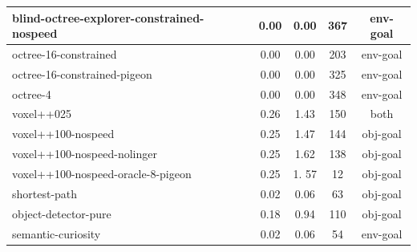 \begin{longtable}{|l|c|c|c|c|}
{\cellcolor[HTML]{D7C5AF}} \color[HTML]{000000}         blind-octree-explorer-constrained-nospeed        &         0.00         &      0.00  &   367 &      {\cellcolor[HTML]{D7C5AF}} \color[HTML]{000000}    env-goal \\ \hline
{\cellcolor[HTML]{D7C5AF}} \color[HTML]{000000}         octree-16-constrained        &         0.00         &      0.00  &   203 &              {\cellcolor[HTML]{D7C5AF}} \color[HTML]{000000}    env-goal \\ \hline
{\cellcolor[HTML]{D7C5AF}} \color[HTML]{000000}         octree-16-constrained-pigeon         &      0.00      &       0.00   &   325 &       {\cellcolor[HTML]{D7C5AF}} \color[HTML]{000000}   env-goal \\ \hline
{\cellcolor[HTML]{D7C5AF}} \color[HTML]{000000}         octree-4         &      0.00      &       0.00   &   348 &                           {\cellcolor[HTML]{D7C5AF}} \color[HTML]{000000}   env-goal \\ \hline
{\cellcolor[HTML]{B5C3D7}} \color[HTML]{000000}         voxel++025       &        0.26        &         1.43     &   150 &                         {\cellcolor[HTML]{B5C3D7}} \color[HTML]{000000} both \\ \hline
{\cellcolor[HTML]{C4D7B8}} \color[HTML]{000000}         voxel++100-nospeed       &        0.25        &         1.47     &   144 &                 {\cellcolor[HTML]{C4D7B8}} \color[HTML]{000000} obj-goal \\ \hline
{\cellcolor[HTML]{C4D7B8}} \color[HTML]{000000}         voxel++100-nospeed-nolinger      &       0.25       &        1.62    &   138 &        {\cellcolor[HTML]{C4D7B8}} \color[HTML]{000000} obj-goal \\ \hline
{\cellcolor[HTML]{C4D7B8}} \color[HTML]{000000}         voxel++100-nospeed-oracle-8-pigeon       &        0.25        &         1.  57   & 12 & {\cellcolor[HTML]{C4D7B8}} \color[HTML]{000000} obj-goal \\ \hline
{\cellcolor[HTML]{C4D7B8}} \color[HTML]{000000}         shortest-path        &         0.02         &      0.06  &   63 &                       {\cellcolor[HTML]{C4D7B8}} \color[HTML]{000000} obj-goal \\ \hline
{\cellcolor[HTML]{C4D7B8}} \color[HTML]{000000}         object-detector-pure & 0.18 & 0.94 & 110        &               {\cellcolor[HTML]{C4D7B8}} \color[HTML]{000000} obj-goal \\ \hline
{\cellcolor[HTML]{D7C5AF}} \color[HTML]{000000}         semantic-curiosity       &        0.02        &         0.06     &   54 &                  {\cellcolor[HTML]{D7C5AF}} \color[HTML]{000000}     env-goal \\ \hline

\end{longtable}
